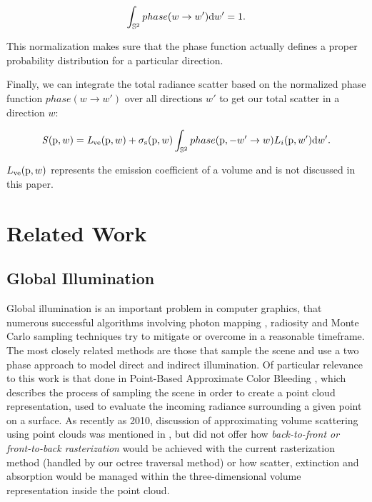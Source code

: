 \documentclass[runningheads]{llncs}
\begin{document}
\begin{equation}
\int_{\mathbb{S}^2}phase(w \to w')\textup{d}w' = 1.
\label{source_eq}
\end{equation}

This normalization makes sure that the phase function actually defines a proper probability distribution for a particular direction.

Finally, we can integrate the total radiance scatter based on the normalized phase function $phase(w \to w')$ over all directions $w'$ to get our total scatter in a direction $w$:

\begin{displaymath}
\mathit{S}(\textup{p},w) = \mathit{L}_{\textup{ve}}(\textup{p},w) + \sigma_{\textup{s}}(\textup{p}, w) \int_{\mathbb{S}^2} phase(\textup{p}, -w' \to w) L_{i}(\textup{p},w')\textup{d}w'.
\end{displaymath}

$L_{\textup{ve}}(\textup{p}, w)$ represents the emission coefficient of a volume and is not discussed in this paper.


\section{Related Work}

\subsection{Global Illumination}
Global illumination is an important problem in computer graphics, that numerous successful algorithms involving photon mapping \cite{Jensen:2009}, radiosity \cite{radiosity} and Monte Carlo sampling techniques \cite{monte_carlo} try to mitigate or overcome in a reasonable timeframe.  The most closely related methods are those that sample the scene and use a two phase approach to model direct and indirect illumination. Of particular relevance to this work is that done in Point-Based Approximate Color Bleeding \cite{christensen:2008}, which describes the process of sampling the scene in order to create a point cloud representation, used to evaluate the incoming radiance surrounding a given point on a surface.  As recently as 2010, discussion of approximating volume scattering using point clouds was mentioned in \cite{christensen:siggraph}, but did not offer how \textit{back-to-front or front-to-back rasterization} would be achieved with the current rasterization method (handled by our octree traversal method) or how scatter, extinction and absorption would be managed within the three-dimensional volume representation inside the point cloud.
\end{document}
